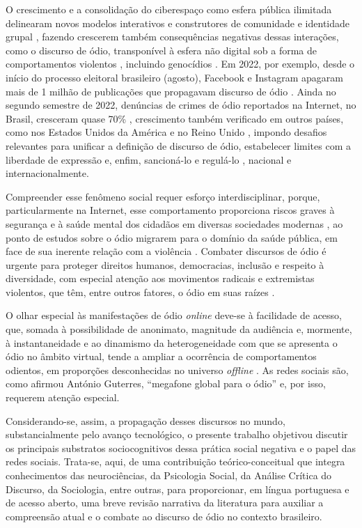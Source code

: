 \documentclass[portuguese]{textolivre}
\begin{document}
O crescimento e a consolidação do ciberespaço como esfera pública ilimitada delinearam novos modelos interativos e construtores de comunidade e identidade grupal \cite{kopytowska2017stereotypes}, fazendo crescerem também consequências negativas dessas interações, como o discurso de ódio, transponível à esfera não digital sob a forma de comportamentos violentos \cite{williams2020hate}, incluindo genocídios \cite{united2019}. Em 2022, por exemplo, desde o início do processo eleitoral brasileiro (agosto), Facebook e Instagram apagaram mais de 1 milhão de publicações que propagavam discurso de ódio \cite{matoso2023}. Ainda no segundo semestre de 2022, denúncias de crimes de ódio reportados na Internet, no Brasil, cresceram quase 70\% \cite{pinheiro2022}, crescimento também verificado em outros países, como nos Estados Unidos da América e no Reino Unido \cite{pretus2023psychology}, impondo desafios relevantes para unificar a definição de discurso de ódio, estabelecer limites com a liberdade de expressão e, enfim, sancioná-lo e regulá-lo \cite{luccas2020}, nacional e internacionalmente.


Compreender esse fenômeno social requer esforço interdisciplinar, porque, particularmente na Internet, esse comportamento proporciona riscos graves à segurança e à saúde mental dos cidadãos em diversas sociedades modernas \cite{solovev2023moralized}, ao ponto de estudos sobre o ódio migrarem para o domínio da saúde pública, em face de sua inerente relação com a violência \cite{krug2002world}. Combater discursos de ódio é urgente para proteger direitos humanos, democracias, inclusão e respeito à diversidade, com especial atenção aos movimentos radicais e extremistas violentos, que têm, entre outros fatores, o ódio em suas raízes \cite{sternberg2005}.

O olhar especial às manifestações de ódio \emph{online} deve-se à facilidade de acesso, que, somada à possibilidade de anonimato, magnitude da audiência e, mormente, à instantaneidade e ao dinamismo da heterogeneidade com que se apresenta o ódio no âmbito virtual, tende a ampliar a ocorrência de comportamentos odientos, em proporções desconhecidas no universo \emph{offline} \cite{brown2017hate}. As redes sociais são, como afirmou António Guterres, “megafone global para o ódio” \cite{united20192020} e, por isso, requerem atenção especial.

Considerando-se, assim, a propagação desses discursos no mundo, substancialmente pelo avanço tecnológico, o presente trabalho objetivou discutir os principais substratos sociocognitivos dessa prática social negativa e o papel das redes sociais. Trata-se, aqui, de uma contribuição teórico-conceitual que integra conhecimentos das neurociências, da Psicologia Social, da Análise Crítica do Discurso, da Sociologia, entre outras, para proporcionar, em língua portuguesa e de acesso aberto, uma breve revisão narrativa da literatura para auxiliar a compreensão atual e o combate ao discurso de ódio no contexto brasileiro.
\end{document}
